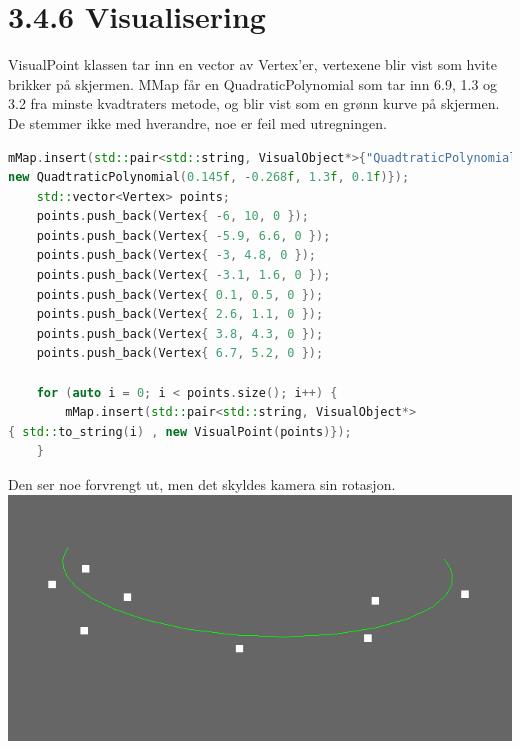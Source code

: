 \documentclass[a4paper,norsk]{article}
\begin{document}
\section{3.4.6 Visualisering}
VisualPoint klassen tar inn en vector av Vertex'er, vertexene blir vist som hvite brikker på skjermen. MMap får en QuadraticPolynomial som tar inn 6.9, 1.3 og 3.2 fra minste kvadtraters metode, og blir vist som en grønn kurve på skjermen.
De stemmer ikke med hverandre, noe er feil med utregningen.
\begin{lstlisting}[language=C++, caption={renderwindow.cpp}]
mMap.insert(std::pair<std::string, VisualObject*>{"QuadtraticPolynomial", 
new QuadtraticPolynomial(0.145f, -0.268f, 1.3f, 0.1f)});
    std::vector<Vertex> points;
    points.push_back(Vertex{ -6, 10, 0 });
    points.push_back(Vertex{ -5.9, 6.6, 0 });
    points.push_back(Vertex{ -3, 4.8, 0 });
    points.push_back(Vertex{ -3.1, 1.6, 0 });
    points.push_back(Vertex{ 0.1, 0.5, 0 });
    points.push_back(Vertex{ 2.6, 1.1, 0 });
    points.push_back(Vertex{ 3.8, 4.3, 0 });
    points.push_back(Vertex{ 6.7, 5.2, 0 });

    for (auto i = 0; i < points.size(); i++) {
        mMap.insert(std::pair<std::string, VisualObject*>
{ std::to_string(i) , new VisualPoint(points)});
    }
\end{lstlisting}
Den ser noe forvrengt ut, men det skyldes kamera sin rotasjon.
\centering
\includegraphics[width=\textwidth]{MatteOblig2Minstekvadratersmetode}
\end{document}
